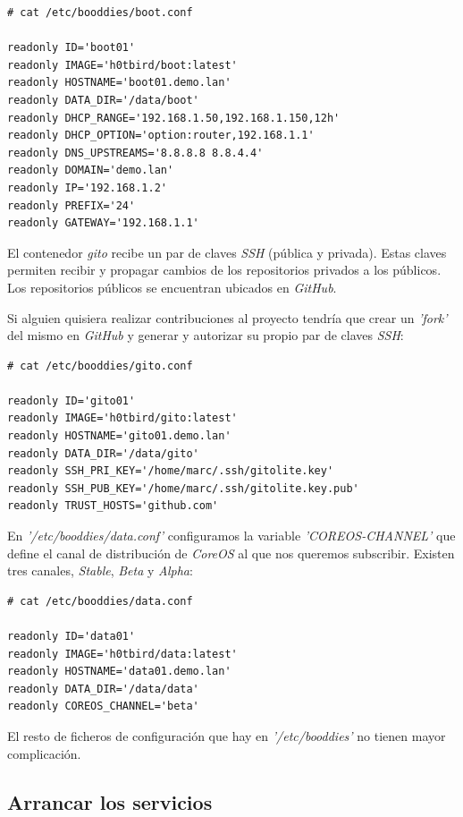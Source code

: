 \documentclass[a4paper,12pt,spanish,final]{epsc_tfc_pfc}
\begin{document}
\begin{lstlisting}[style=dnsmasq]
# cat /etc/booddies/boot.conf

readonly ID='boot01'
readonly IMAGE='h0tbird/boot:latest'
readonly HOSTNAME='boot01.demo.lan'
readonly DATA_DIR='/data/boot'
readonly DHCP_RANGE='192.168.1.50,192.168.1.150,12h'
readonly DHCP_OPTION='option:router,192.168.1.1'
readonly DNS_UPSTREAMS='8.8.8.8 8.8.4.4'
readonly DOMAIN='demo.lan'
readonly IP='192.168.1.2'
readonly PREFIX='24'
readonly GATEWAY='192.168.1.1'
\end{lstlisting}

El contenedor \emph{gito} recibe un par de claves \emph{SSH} (pública y privada). Estas claves permiten recibir y propagar cambios de los repositorios privados a los públicos. Los repositorios públicos se encuentran ubicados en \emph{GitHub}.

Si alguien quisiera realizar contribuciones al proyecto tendría que crear un \emph{'fork'} del mismo en \emph{GitHub} y generar y autorizar su propio par de claves \emph{SSH}:\\

\begin{lstlisting}[style=dnsmasq]
# cat /etc/booddies/gito.conf

readonly ID='gito01'
readonly IMAGE='h0tbird/gito:latest'
readonly HOSTNAME='gito01.demo.lan'
readonly DATA_DIR='/data/gito'
readonly SSH_PRI_KEY='/home/marc/.ssh/gitolite.key'
readonly SSH_PUB_KEY='/home/marc/.ssh/gitolite.key.pub'
readonly TRUST_HOSTS='github.com'
\end{lstlisting}

En \emph{'/etc/booddies/data.conf'} configuramos la variable \emph{'COREOS-CHANNEL'} que define el canal de distribución de \emph{CoreOS} al que nos queremos subscribir. Existen tres canales, \emph{Stable}, \emph{Beta} y \emph{Alpha}:\\

\begin{lstlisting}[style=dnsmasq]
# cat /etc/booddies/data.conf

readonly ID='data01'
readonly IMAGE='h0tbird/data:latest'
readonly HOSTNAME='data01.demo.lan'
readonly DATA_DIR='/data/data'
readonly COREOS_CHANNEL='beta'
\end{lstlisting}

El resto de ficheros de configuración que hay en \emph{'/etc/booddies'} no tienen mayor complicación.

\clearpage

\subsection{Arrancar los servicios}
\end{document}
